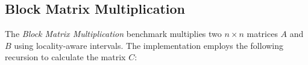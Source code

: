 


\subsection{Block Matrix Multiplication}
\label{sec:locality-performance-block-matrix-multiplication}

The \emph{Block Matrix Multiplication} benchmark multiplies two $n
\times n$ matrices $A$ and $B$ using locality-aware intervals. The
implementation employs the following recursion to calculate the matrix
$C$:

